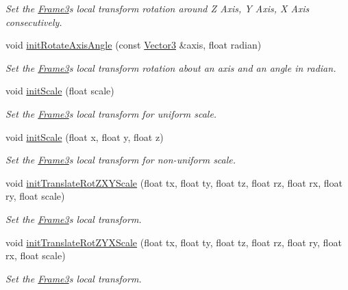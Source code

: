 \begin{DoxyCompactItemize}
\begin{DoxyCompactList}\small\item\em Set the \hyperlink{class_magnum_1_1_frame3}{Frame3}\textquotesingle{}s local transform rotation around Z Axis, Y Axis, X Axis consecutively. \end{DoxyCompactList}\item 
void \hyperlink{class_magnum_1_1_frame3_af752b16366cbad81f44b9120f4cfb2dc}{init\+Rotate\+Axis\+Angle} (const \hyperlink{class_magnum_1_1_vector3}{Vector3} \&axis, float radian)
\begin{DoxyCompactList}\small\item\em Set the \hyperlink{class_magnum_1_1_frame3}{Frame3}\textquotesingle{}s local transform rotation about an axis and an angle in radian. \end{DoxyCompactList}\item 
void \hyperlink{class_magnum_1_1_frame3_af52afff1c5244fe1304cfd2ce858dcde}{init\+Scale} (float scale)
\begin{DoxyCompactList}\small\item\em Set the \hyperlink{class_magnum_1_1_frame3}{Frame3}\textquotesingle{}s local transform for uniform scale. \end{DoxyCompactList}\item 
void \hyperlink{class_magnum_1_1_frame3_a35c7e0ad809c4e13e799f317459bb8c1}{init\+Scale} (float x, float y, float z)
\begin{DoxyCompactList}\small\item\em Set the \hyperlink{class_magnum_1_1_frame3}{Frame3}\textquotesingle{}s local transform for non-\/uniform scale. \end{DoxyCompactList}\item 
void \hyperlink{class_magnum_1_1_frame3_a14b19e545aa169917b00187448a10573}{init\+Translate\+Rot\+Z\+X\+Y\+Scale} (float tx, float ty, float tz, float rz, float rx, float ry, float scale)
\begin{DoxyCompactList}\small\item\em Set the \hyperlink{class_magnum_1_1_frame3}{Frame3}\textquotesingle{}s local transform. \end{DoxyCompactList}\item 
void \hyperlink{class_magnum_1_1_frame3_a92f9d0ce60fc7cadc2d4b7e7179af622}{init\+Translate\+Rot\+Z\+Y\+X\+Scale} (float tx, float ty, float tz, float rz, float ry, float rx, float scale)
\begin{DoxyCompactList}\small\item\em Set the \hyperlink{class_magnum_1_1_frame3}{Frame3}\textquotesingle{}s local transform. \end{DoxyCompactList}\item 

\end{DoxyCompactItemize}
